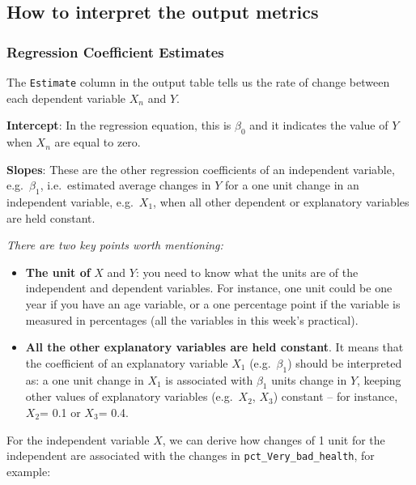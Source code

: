 \documentclass[
  letterpaper,
  DIV=11,
  numbers=noendperiod]{scrreprt}
\providecommand{\tightlist}{%
  \setlength{\itemsep}{0pt}\setlength{\parskip}{0pt}}\usepackage{longtable,booktabs,array}
\begin{document}
\subsection{How to interpret the output
metrics}\label{how-to-interpret-the-output-metrics}

\subsubsection{\texorpdfstring{\textbf{Regression} Coefficient
Estimates}{Regression Coefficient Estimates}}\label{regression-coefficient-estimates}

The \texttt{Estimate} column in the output table tells us the rate of
change between each dependent variable \(X_n\) and \(Y\).

\textbf{Intercept}: In the regression equation, this is \(β_0\) and it
indicates the value of \(Y\) when \(X_n\) are equal to zero.

\textbf{Slopes}: These are the other regression coefficients of an
independent variable, e.g.~\(β_1\), i.e.~estimated average changes in
\(Y\) for a one unit change in an independent variable, e.g.~\(X_1\),
when all other dependent or explanatory variables are held constant.

\emph{There are two key points worth mentioning:}

\begin{itemize}
\tightlist
\item
  \textbf{The unit of} \(X\) and \(Y\): you need to know what the units
  are of the independent and dependent variables. For instance, one unit
  could be one year if you have an age variable, or a one percentage
  point if the variable is measured in percentages (all the variables in
  this week's practical).
\item
  \textbf{All the other explanatory variables are held constant}. It
  means that the coefficient of an explanatory variable \(X_1\)
  (e.g.~\(β_1\)) should be interpreted as: a one unit change in \(X_1\)
  is associated with \(β_1\) units change in \(Y\), keeping other values
  of explanatory variables (e.g.~\(X_2\), \(X_3\)) constant -- for
  instance, \(X_2\)= 0.1 or \(X_3\)= 0.4.
\end{itemize}

For the independent variable \(X\), we can derive how changes of 1 unit
for the independent are associated with the changes in
\texttt{pct\_Very\_bad\_health}, for example:
\end{document}

